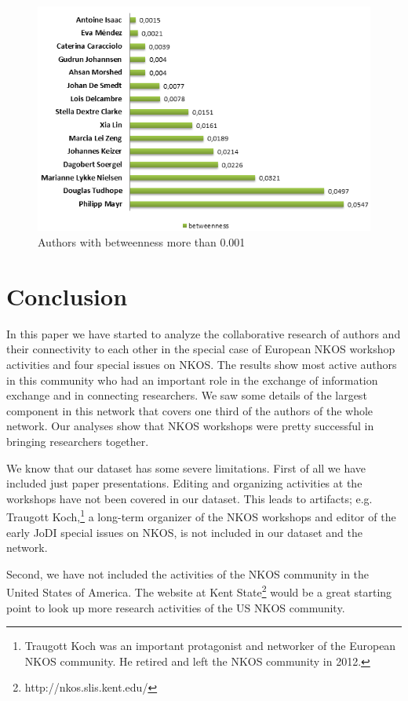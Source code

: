 \documentclass[runningheads,a4paper]{llncs}
\begin{document}
\begin{figure}
\centering
\includegraphics[width=0.8\linewidth]{betweenness}
\caption{Authors with betweenness more than 0.001}
\label{fig:betweenness}
\end{figure}


\section{Conclusion}\label{concl}
In this paper we have started to analyze the collaborative research of authors and their connectivity to each other in the special case of European NKOS workshop activities and four special issues on NKOS. The results show most active authors in this community who had an important role in the exchange of  information exchange and in connecting researchers. We saw some details of the largest component in this network that covers one third of the authors of the whole network. Our analyses show that NKOS workshops were pretty successful in bringing researchers together.  

We know that our dataset has some severe limitations. 
First of all we have included just paper presentations. Editing and organizing activities at the workshops have not been covered in our dataset. This leads to artifacts; e.g. Traugott Koch,\footnote{Traugott Koch was an important protagonist and networker of the European NKOS community. He retired and left the NKOS community in 2012.} a long-term organizer of the NKOS workshops and editor of the early JoDI special issues on NKOS, is not included in our dataset and the network. 

Second, we have not included the activities of the NKOS community in the United States of America. The website at Kent State\footnote{http://nkos.slis.kent.edu/} would be a great starting point to look up more research activities of the US NKOS community.
\end{document}
